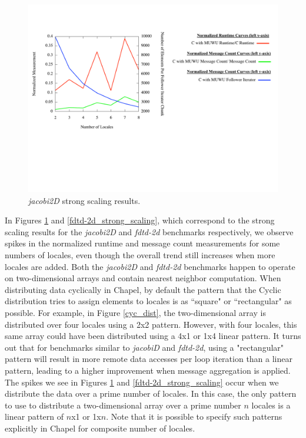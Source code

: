 \begin{figure}
\begin{center}
\includegraphics[width=\linewidth]{./Figures/strong_scaling/jacobi-2d.pdf}
\caption{\textit{jacobi2D} strong scaling results.}
\label{jacobi-2d_strong_scaling}
\end{center}
\end{figure}

In Figures \ref{jacobi-2d_strong_scaling} and \ref{fdtd-2d_strong_scaling}, which correspond to the strong scaling results for the \textit{jacobi2D} and \textit{fdtd-2d} benchmarks respectively, we observe spikes in the normalized runtime and message count measurements for some numbers of locales, even though the overall trend still increases when more locales are added. Both the \textit{jacobi2D} and \textit{fdtd-2d} benchmarks happen to operate on two-dimensional arrays and contain nearest neighbor computation. When distributing data cyclically in Chapel, by default the pattern that the Cyclic distribution tries to assign elements to locales is as ``square" or ``rectangular" as possible. For example, in Figure \ref{cyc_dist}, the two-dimensional array is distributed over four locales using a 2x2 pattern. However, with four locales, this same array could have been distributed using a 4x1 or 1x4 linear pattern. It turns out that for benchmarks similar to \textit{jacobiD} and \textit{fdtd-2d}, using a "rectangular" pattern will result in more remote data accesses per loop iteration than a linear pattern, leading to a higher improvement when message aggregation is applied. The spikes we see in Figures \ref{jacobi-2d_strong_scaling} and \ref{fdtd-2d_strong_scaling} occur when we distribute the data over a prime number of locales. In this case, the only pattern to use to distribute a two-dimensional array over a prime number $n$ locales is a linear pattern of $n$x1 or 1x$n$. Note that it is possible to specify such patterns explicitly in Chapel for composite number of locales. 

